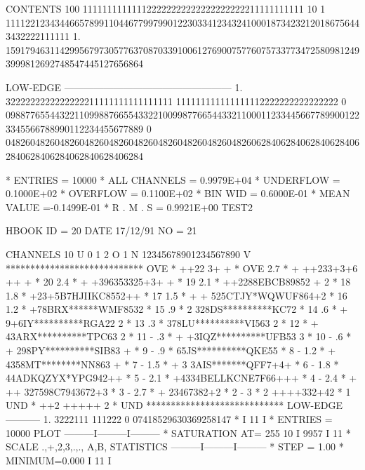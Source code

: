\begin{Listing}
 CONTENTS 100                               111111111111122222222222222222222211111111111                           
           10      1    1111221234344665789911044677997990122303341234324100018734232120186756443432222111111       
            1.  1591794631142995679730577637087033910061276900757760757337734725809812493999812692748547445127656864
 
 LOW-EDGE       ---------------------------------------------------                                                 
            1.  3222222222222222211111111111111111                                 111111111111111112222222222222222
            0   0988776554432211099887665543322100998776654433211000112334456677899001223345566788990112234455677889
            0   0482604826048260482604826048260482604826048260482606284062840628406284062840628406284062840628406284
 
 * ENTRIES =      10000      * ALL CHANNELS = 0.9979E+04      * UNDERFLOW = 0.1000E+02      * OVERFLOW = 0.1100E+02
 * BIN WID = 0.6000E-01      * MEAN VALUE   =-0.1499E-01      * R . M . S = 0.9921E+00
\newpage\scriptsize
 TEST2                                                                           
 
 HBOOK     ID = 20                       DATE  17/12/91              NO =  21
 
 CHANNELS  10 U 0        1         2 O 
            1 N 12345678901234567890 V 
            ****************************
   OVE      *         ++22 3+  +       * OVE
     2.7    *     + ++233+3+6 ++ +     *  20
     2.4    *      + +396353325+3+ +   *  19
     2.1    *    ++2288EBCB89852 + 2   *  18
     1.8    *   +23+5B7HJIIKC8552++    *  17
     1.5    * + + 525CTJY*WQWUF864+2   *  16
     1.2    *    +78BRX******WMF8532   *  15
      .9    * 2 328DS**********KC72    *  14
      .6    * + 9+6IY**********RGA22 2 *  13
      .3    *   378LU**********VI563 2 *  12
            * + 43ARX**********TPC63 2 *  11
 -    .3    * + +3IQZ**********UFB53 3 *  10
 -    .6    * + 298PY**********SIB83 + *   9
 -    .9    *    65JS**********QKE55   *   8
 -   1.2    * + 4358MT********NN863  + *   7
 -   1.5    * + 3 3AIS*******QFF7+4+   *   6
 -   1.8    *     44ADKQZYX*YPG942++   *   5
 -   2.1    *   +4334BELLKCNE7F66+++   *   4
 -   2.4    * + ++ 327598C7943672+3    *   3
 -   2.7    *      + 23467382+2        *   2
 -   3      *      2 ++++332+42        *   1
   UND      *        ++2 +++++ 2       * UND
            ****************************
 LOW-EDGE       -----------         
            1.  3222111       111222
            0   07418529630369258147
  *                                                        I   11    I
  * ENTRIES =    10000                 PLOT       ---------I---------I---------
  * SATURATION  AT=          255                     10    I 9957    I   11
  * SCALE  .,+,2,3,.,., A,B,         STATISTICS   ---------I---------I---------
  * STEP = 1.00     * MINIMUM=0.000                        I   11    I


\end{Listing}
